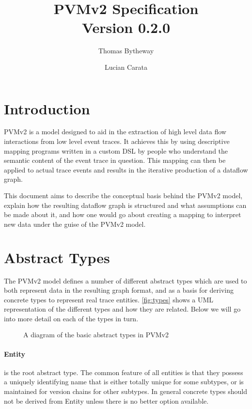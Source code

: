 \documentclass[12pt,twoside,a4paper]{article}
\newcommand{\para}[1]{\paragraph{#1\\}}
\begin{document}
\title{PVMv2 Specification\\\normalsize Version 0.2.0}
\author{Thomas Bytheway \and Lucian Carata}

\maketitle

\clearpage

\section{Introduction}
\label{sec:intro}
PVMv2 is a model designed to aid in the extraction of high level data flow interactions from low level event traces. It achieves this by using descriptive mapping programs written in a custom DSL by people who understand the semantic content of the event trace in question. This mapping can then be applied to actual trace events and results in the iterative production of a dataflow graph.

This document aims to describe the conceptual basis behind the PVMv2 model, explain how the resulting dataflow graph is structured and what assumptions can be made about it, and how one would go about creating a mapping to interpret new data under the guise of the PVMv2 model.

\section{Abstract Types}
\label{sec:ty}
The PVMv2 model defines a number of different abstract types which are used to both represent data in the resulting graph format, and as a basis for deriving concrete types to represent real trace entities. \autoref{fig:types} shows a UML representation of the different types and how they are related. Below we will go into more detail on each of the types in turn.

\begin{figure}[h]
\centering

\caption{A diagram of the basic abstract types in PVMv2}
\label{fig:types}
\end{figure}

\para{Entity}
\label{sec:ty:entity}
 is the root abstract type. The common feature of all entities is that they possess a uniquely identifying name that is either totally unique for some subtypes, or is maintained for version chains for other subtypes. In general concrete types should not be derived from Entity unless there is no better option available.
\end{document}

